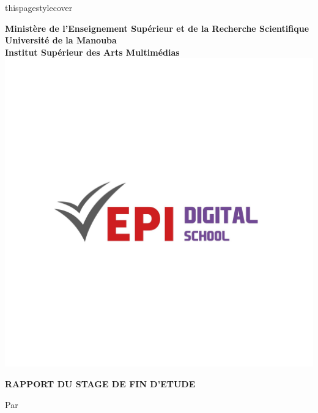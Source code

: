 thispagestyle{cover}%
\hspace{-0.5cm}

\begin{center}
{\large{\textbf{{Ministère de l’Enseignement Supérieur et de la Recherche Scientifique}}}}\\
\vskip0.5cm
{\Large{\textbf{{Université de la Manouba}}}}\\
\vskip0.5cm
{\Large{\textbf{{Institut Supérieur des Arts Multimédias}}}}\\
\vskip1.5cm
\includegraphics[width=0.24\columnwidth]{./Figures/Images/EPI digital.png}
\end{center}

\vskip0.8cm

\begin{center}
{\Large{\textbf{{RAPPORT DU STAGE DE FIN D'ETUDE}}}}\\
\vskip0.5cm

{}
\end{center}

\begin{center}
\textrm{Par}\\
\vskip0.2cm
{
    {%
        \begin{minipage}[l]{0.5\columnwidth}
            \begin{center}{\large\textbf{\@author}}\end{center}
        \end{minipage}
        
    }
    {\large\textbf{\@author}}
}
\vskip12mm


\begin{changemargin}{-9mm}{0cm}
\begin{minipage}[l]{1.1\columnwidth}
\begin{tcolorbox}[colframe=isiBlue,colback=white,boxrule=0pt,toprule=3pt,bottomrule=3pt,arc=2pt,top=0mm,right=0mm,left=0mm,bottom=0mm,boxsep=0.5mm]{
    \begin{tcolorbox}[colframe=isiBlue,colback=white, boxrule=0pt,toprule=1pt,bottomrule=1pt,arc=1pt,enlarge bottom by=-0.9mm, auto outer arc]
        \centering
        {\huge\textbf{\@title}}
    \end{tcolorbox}
}
\end{tcolorbox}
\end{minipage}
\end{changemargin}

\end{center}
\vskip8mm

